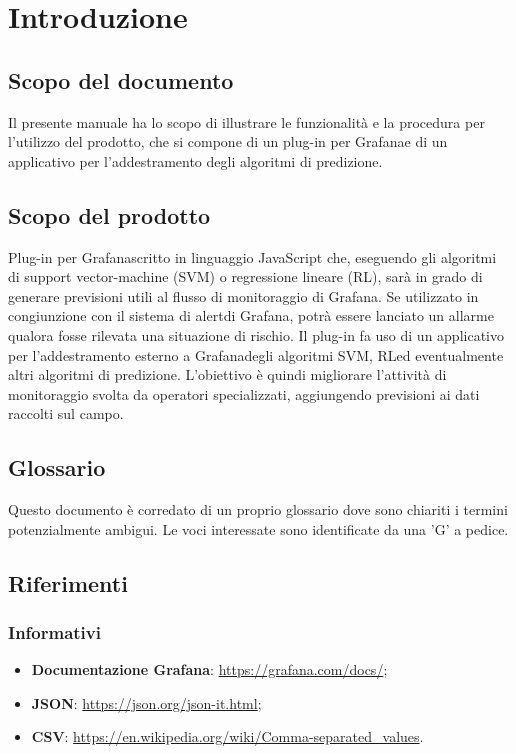 \section{Introduzione}
	\subsection{Scopo del documento}
		Il presente manuale ha lo scopo di illustrare le funzionalità e la procedura per l'utilizzo del prodotto\glo, che si compone di un plug-in per Grafana\glosp e di un applicativo per l'addestramento degli algoritmi di predizione.
	\subsection{Scopo del prodotto}
		Plug-in per Grafana\glosp scritto in linguaggio JavaScript che, eseguendo gli algoritmi di support vector-machine (SVM\glo) o regressione lineare (RL\glo), sarà in grado di generare previsioni utili al flusso di monitoraggio di Grafana\glo. Se utilizzato in congiunzione con il sistema di alert\glosp di Grafana\glo, potrà essere lanciato un allarme qualora fosse rilevata una situazione di rischio.
		Il plug-in fa uso di un applicativo per l'addestramento esterno a Grafana\glosp degli algoritmi SVM\glo, RL\glosp ed eventualmente altri algoritmi di predizione. L'obiettivo è quindi migliorare l'attività di monitoraggio svolta da operatori specializzati, aggiungendo previsioni ai dati raccolti sul campo.
	\subsection{Glossario}
		Questo documento è corredato di un proprio glossario dove sono chiariti i termini potenzialmente ambigui. Le voci interessate sono identificate da una 'G' a pedice.
	\subsection{Riferimenti}
		\subsubsection{Informativi}
		\begin{itemize}
			\item \textbf{Documentazione Grafana}: \url{https://grafana.com/docs/};
			\item \textbf{JSON}: \url{https://json.org/json-it.html};
			\item \textbf{CSV}: \url{https://en.wikipedia.org/wiki/Comma-separated_values}.
		\end{itemize}
